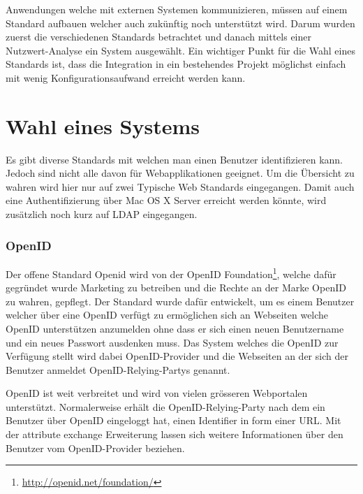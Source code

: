 Anwendungen welche mit externen Systemen kommunizieren, müssen auf einem
Standard aufbauen welcher auch zukünftig noch unterstützt wird. Darum wurden
zuerst die verschiedenen Standards betrachtet und danach mittels einer
Nutzwert-Analyse ein System ausgewählt. Ein wichtiger Punkt für die Wahl eines
Standards ist, dass die Integration in ein bestehendes Projekt möglichst einfach
mit wenig Konfigurationsaufwand erreicht werden kann.

\section{Wahl eines Systems}
\label{sec:Wahl eines Systems}
Es gibt diverse Standards mit welchen man einen Benutzer identifizieren kann.
Jedoch sind nicht alle davon für Webapplikationen geeignet. Um die Übersicht zu
wahren wird hier nur auf zwei Typische Web Standards eingegangen. Damit auch
eine Authentifizierung über Mac OS X Server erreicht werden könnte, wird
zusätzlich noch kurz auf LDAP eingegangen.

\subsubsection{OpenID}
\label{ssub:OpenID}
Der offene Standard Openid wird von der OpenID
Foundation\footnote{\url{http://openid.net/foundation/}}, welche dafür gegründet
wurde Marketing zu betreiben und die Rechte an der Marke OpenID zu wahren,
gepflegt. Der Standard wurde dafür entwickelt, um es einem Benutzer welcher über
eine OpenID verfügt zu ermöglichen sich an Webseiten welche OpenID unterstützen
anzumelden ohne dass er sich einen neuen Benutzername und ein neues Passwort
ausdenken muss. Das System welches die OpenID zur Verfügung stellt wird dabei
\gls{OpenID-Provider} und die Webseiten an der sich der Benutzer anmeldet
\glspl{OpenID-Relying-Party} genannt.

OpenID ist weit verbreitet und wird von vielen grösseren Webportalen
unterstützt. Normalerweise erhält die \gls{OpenID-Relying-Party} nach dem ein
Benutzer über OpenID eingeloggt hat, einen Identifier in form einer URL. Mit der
attribute exchange Erweiterung lassen sich weitere Informationen über den
Benutzer vom \gls{OpenID-Provider} beziehen.

